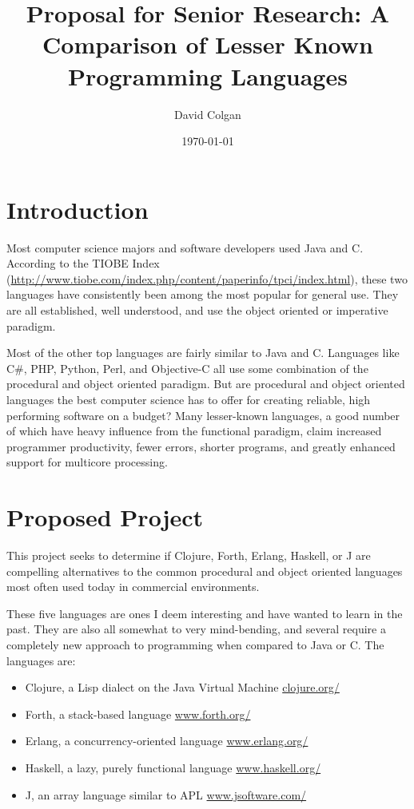 \documentclass{article}
\title{Proposal for Senior Research: A Comparison of Lesser Known Programming
Languages}
\author{David Colgan}
\date{\today}
\begin{document}
\maketitle

\section{Introduction}

Most computer science majors and software developers used Java and C.  According to the TIOBE Index
(\url{http://www.tiobe.com/index.php/content/paperinfo/tpci/index.html}), these
two languages have consistently been among the most popular for general use.  They are
all established, well understood, and use the object oriented or
imperative paradigm.

Most of the other top languages are fairly similar to Java and C.  Languages
like C\#, PHP, Python, Perl, and Objective-C all use some combination of the
procedural and object oriented paradigm.   But are procedural and object
oriented languages the best computer science has to offer for creating reliable,
high performing software on a budget?  Many lesser-known languages, a good
number of which have heavy influence from the functional paradigm, claim
increased programmer productivity, fewer errors, shorter programs, and greatly
enhanced support for multicore processing.

\section{Proposed Project}

This project seeks to determine if Clojure, Forth, Erlang, Haskell, or J are
compelling alternatives to the common procedural and object oriented languages
most often used today in commercial environments.

These five languages are ones
I deem interesting and have wanted to learn in the past.  They are also all somewhat to very
mind-bending, and several require a completely new approach to programming when
compared to Java or C.  The languages are:

\begin{itemize}
\item Clojure, a Lisp dialect on the Java Virtual Machine
\url{clojure.org/}

\item Forth, a stack-based language
\url{www.forth.org/}

\item Erlang, a concurrency-oriented language
\url{www.erlang.org/}

\item Haskell, a lazy, purely functional language
\url{www.haskell.org/}

\item J, an array language similar to APL
\url{www.jsoftware.com/}
\end{itemize}
\end{document}
